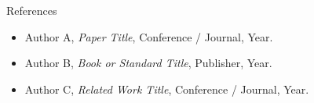 \begin{frame}{References}

\begin{itemize}
    \item Author A, \textit{Paper Title}, Conference / Journal, Year.
    \item Author B, \textit{Book or Standard Title}, Publisher, Year.
    \item Author C, \textit{Related Work Title}, Conference / Journal, Year.
\end{itemize}

\end{frame}
